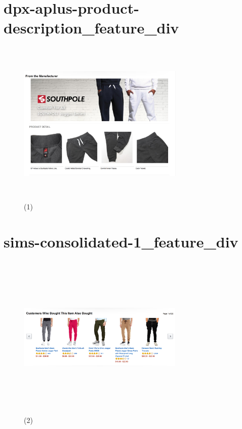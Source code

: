 \documentclass[12pt]{article}
\begin{document}
\pagebreak
\section*{dpx-aplus-product-description\_feature\_div}
\begin{figure}[htp]
\centering
\includegraphics[width=300px,height=300px]{images/dpx-aplus-product-description_feature_div(2).png}
\caption{(1)}
\end{figure}


\pagebreak

\section*{sims-consolidated-1\_feature\_div}
\begin{figure}[htp]
\includegraphics[width=300px,height=300px]{images/sims-consolidated-1_feature_div(2).png}
\caption{(2)}
\end{figure}

\pagebreak
\end{document}
